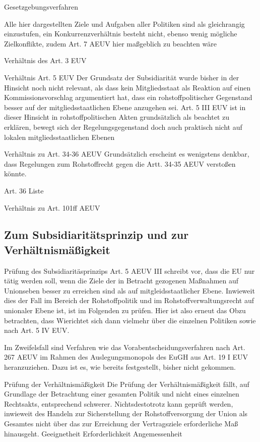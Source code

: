 \documentclass[12pt,a4paper,oneside]{book} %
\begin{document}
Gesetzgebungsverfahren
	
Alle hier dargestellten Ziele und Aufgaben aller Politiken sind als gleichrangig einzustufen, ein Konkurrenzverhältnis besteht nicht, ebenso wenig mögliche Zielkonflikte, zudem Art. 7 AEUV hier maßgeblich zu beachten wäre

Verhältnis des Art. 3 EUV
	
Verhältnis Art. 5 EUV
Der Grundsatz der Subsidiarität wurde bisher in der Hinsicht noch nicht relevant, als dass kein Mitgliedsstaat als Reaktion auf einen Kommissionsvorschlag argumentiert hat, dass ein rohstoffpolitischer Gegenstand besser auf der mitgliedsstaatlichen Ebene anzugehen sei. Art. 5 III EUV ist in dieser Hinsicht in rohstoffpolitischen Akten grundsätzlich als beachtet zu erklären, bewegt sich der Regelungsgegenstand doch auch praktisch nicht auf lokalen mitgliedsstaatlichen Ebenen
	
Verhältnis zu Art. 34-36 AEUV
Grundsätzlich erscheint es wenigstens denkbar, dass Regelungen zum Rohstoffrecht gegen die Artt. 34-35 AEUV verstoßen könnte.
	
Art. 36 Liste
	
Verhältnis zu Art. 101ff AEUV
	
\subsection{Zum Subsidiaritätsprinzip und zur Verhältnismäßigkeit}

Prüfung des Subsidiaritäsprinzips
	Art. 5 AEUV III schreibt vor, dass die EU nur tätig werden soll, wenn die Ziele der in Betracht gezogenen Maßnahmen auf Unionseben besser zu erreichen sind als auf mitgleidsstaatlicher Ebene. Inwieweit dies der Fall im Bereich der Rohstoffpolitik und im Rohstoffverwaltungsrecht auf unionaler Ebene ist, ist im Folgenden zu prüfen. Hier ist also erneut das \glqq Ob\grqq zu betrachten, dass \glqq Wie\grqq richtet sich dann vielmehr über die einzelnen Politiken sowie nach Art. 5 IV EUV.
	
	Im Zweifelsfall sind Verfahren wie das Vorabentscheidungsverfahren nach Art. 267 AEUV im Rahmen des Auslegungsmonopols des EuGH\autocites[siehe zum Auslegungsmonopol]{Kühn, EuZW 2023, 925}{Streinz, EUV/AEUV, Art. 267, Rn. 6} aus Art. 19 I EUV heranzuziehen. Dazu ist es, wie bereits festgestellt, bisher nicht gekommen.
	
	Prüfung der Verhältnismäßigkeit
	Die Prüfung der Verhältnismäßigkeit fällt, auf Grundlage der Betrachtung einer gesamten Politik und nicht eines einzelnen Rechtsakts, entsprechend schwerer. Nichtsdestotrotz kann geprüft werden, inwieweit des Handeln zur Sicherstellung der Rohstoffversorgung der Union als Gesamtes nicht über das zur Erreichung der Vertragsziele erforderliche Maß hinausgeht.
	Geeignetheit
	Erforderlichkeit
	Angemessenheit
	
\end{document}
